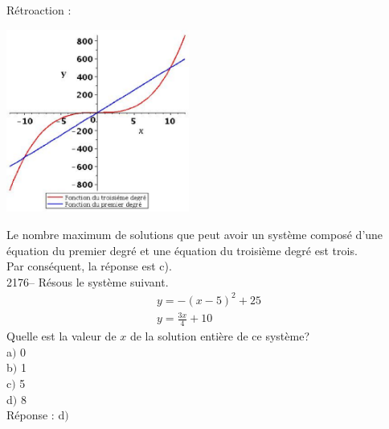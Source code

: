 \documentclass[letterpaper, 12pt]{article}
\begin{document}
R\'etroaction :\\
\begin{center}
 \includegraphics[width=6cm,bb=14 14 415 415]{Q2175.eps}
\end{center}
Le nombre maximum de solutions que peut avoir un syst\`eme compos\'e d'une \'equation du premier degr\'e et une \'equation du troisi\`eme degr\'e est trois.\\
Par cons\'equent, la r\'eponse est c).\\

2176-- R\'esous le syst\`eme suivant.
\begin{eqnarray*}
 y=-(x-5)^{2}+25\\
y=\frac{3x}{4}+10
\end{eqnarray*}
Quelle est la valeur de $x$ de la solution enti\`ere de ce syst\`eme?\\

a$)$ 0\\
b$)$ 1\\
c$)$ 5\\
d$)$ 8\\

R\'eponse : d$)$\\
\end{document}
